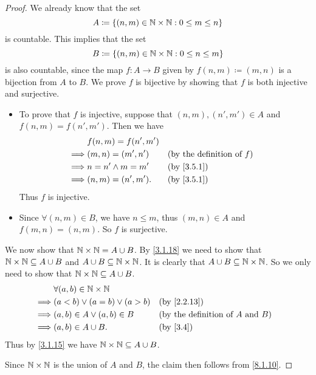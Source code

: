 \begin{proof}
  We already know that the set
  \[
    A \coloneqq \left\lbrace(n, m) \in \mathbb{N} \times \mathbb{N} : 0 \leq m \leq n\right\rbrace
  \]
  is countable.
  This implies that the set
  \[
    B \coloneqq \left\lbrace(n, m) \in \mathbb{N} \times \mathbb{N} : 0 \leq n \leq m\right\rbrace
  \]
  is also countable, since the map \(f : A \to B\) given by \(f(n, m) \coloneqq (m, n)\) is a bijection from \(A\) to \(B\).
  We prove \(f\) is bijective by showing that \(f\) is both injective and surjective.
  \begin{itemize}
    \item To prove that \(f\) is injective, suppose that \((n, m), (n', m') \in A\) and \(f(n, m) = f(n', m')\).
          Then we have
          \begin{align*}
                     & f(n, m) = f(n', m')                                          \\
            \implies & (m, n) = (m', n')   &  & \text{(by the definition of \(f\))} \\
            \implies & n = n' \land m = m' &  & \by{3.5.1}                          \\
            \implies & (n, m) = (n', m').  &  & \by{3.5.1}
          \end{align*}
          Thus \(f\) is injective.
    \item Since \(\forall (n, m) \in B\), we have \(n \leq m\), thus \((m, n) \in A\) and \(f(m, n) = (n, m)\).
          So \(f\) is surjective.
  \end{itemize}

  We now show that \(\mathbb{N} \times \mathbb{N} = A \cup B\).
  By \cref{3.1.18} we need to show that \(\mathbb{N} \times \mathbb{N} \subseteq A \cup B\) and \(A \cup B \subseteq \mathbb{N} \times \mathbb{N}\).
  It is clearly that \(A \cup B \subseteq \mathbb{N} \times \mathbb{N}\).
  So we only need to show that \(\mathbb{N} \times \mathbb{N} \subseteq A \cup B\).
  \begin{align*}
             & \forall (a, b) \in \N \times \N                                                      \\
    \implies & (a < b) \lor (a = b) \lor (a > b) &  & \by{2.2.13}                                   \\
    \implies & (a, b) \in A \lor (a, b) \in B    &  & \text{(by the definition of \(A\) and \(B\))} \\
    \implies & (a, b) \in A \cup B.              &  & \text{(by \cref{3.4})}
  \end{align*}
  Thus by \cref{3.1.15} we have \(\mathbb{N} \times \mathbb{N} \subseteq A \cup B\).

  Since \(\mathbb{N} \times \mathbb{N}\) is the union of \(A\) and \(B\), the claim then follows from \cref{8.1.10}.
\end{proof}

